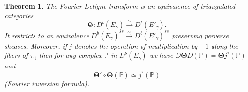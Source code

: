 \documentclass[a4paper,10pt]{amsart}
\def\FD{\boldsymbol{\Theta}}
\newtheorem{theo}{\bf{Theorem}}[section]
\numberwithin{equation}{section}
\begin{document}
\vspace{.1in}

\begin{theo}\label{T:FDT} The Fourier-Deligne transform is an equivalence of triangulated categories
$$\FD: D^b(E_\gamma) \stackrel{\sim}{\to} D^b(E'_{\gamma}).$$
It restricts to an equivalence $D^b(E_{\gamma})^{ss} \stackrel{\sim}{\to} D^b(E'_{\gamma})^{ss}$ preserving perverse sheaves. Moreover, if $j$ denotes the
operation of multiplication by $-1$ along the fibers of $\pi_1$ then for any complex $\mathbb{P}$ in $D^b(E_{\gamma})$ we have $D \FD D (\mathbb{P})= \FD j^*(\mathbb{P})$ and 
$$\FD' \circ \FD (\mathbb{P}) \simeq j^*(\mathbb{P})$$
(Fourier inversion formula).
\end{theo}

\vspace{.1in}
\end{document}
